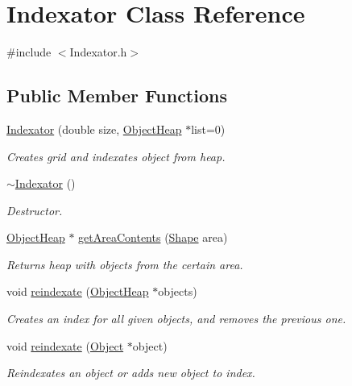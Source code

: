 \hypertarget{classIndexator}{\section{Indexator Class Reference}
\label{classIndexator}
}


{\ttfamily \#include $<$Indexator.\-h$>$}

\subsection*{Public Member Functions}
\begin{DoxyCompactItemize}
\item 
\hyperlink{classIndexator_aa5adafc65a3b10399adb6f2158bc5417}{Indexator} (double size, \hyperlink{classObjectHeap}{Object\-Heap} $\ast$list=0)
\begin{DoxyCompactList}\small\item\em Creates grid and indexates object from heap. \end{DoxyCompactList}\item 
\hyperlink{classIndexator_a1d84445c20808fddf2f8877cfd968a5b}{$\sim$\-Indexator} ()
\begin{DoxyCompactList}\small\item\em Destructor. \end{DoxyCompactList}\item 
\hyperlink{classObjectHeap}{Object\-Heap} $\ast$ \hyperlink{classIndexator_a21eb2f0f155c5d3fe0560a707a05e450}{get\-Area\-Contents} (\hyperlink{classShape}{Shape} area)
\begin{DoxyCompactList}\small\item\em Returns heap with objects from the certain area. \end{DoxyCompactList}\item 
void \hyperlink{classIndexator_ad3ee911b9f5cd04c2c6426dd90bce127}{reindexate} (\hyperlink{classObjectHeap}{Object\-Heap} $\ast$objects)
\begin{DoxyCompactList}\small\item\em Creates an index for all given objects, and removes the previous one. \end{DoxyCompactList}\item 
void \hyperlink{classIndexator_a3c496109b375bc095e15a38d2e8f18d8}{reindexate} (\hyperlink{classObject}{Object} $\ast$object)
\begin{DoxyCompactList}\small\item\em Reindexates an object or adds new object to index. \end{DoxyCompactList}\item 

\end{DoxyCompactItemize}

